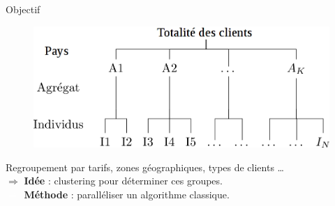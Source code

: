 \begin{frame}{Objectif}

\begin{figure}[!ht]\centering
  \includegraphics[width = \textwidth]{pics/schema.png} 
\end{figure}

Regroupement par tarifs, zones géographiques, types de clients \dots\\[0.3cm]

$\Rightarrow$ \textbf{Idée} : clustering pour déterminer ces groupes.\\[0.3cm]

\textcolor{white}{$\Rightarrow$ }\textbf{Méthode} : paralléliser un algorithme classique.


\end{frame}

